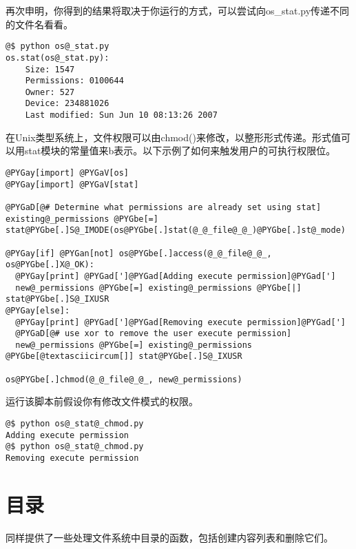 \documentclass[a4paper,10pt,english]{manual}
\begin{document}
再次申明，你得到的结果将取决于你运行的方式，可以尝试向os\_stat.py传递不同的文件名看看。

\begin{Verbatim}[commandchars=@\[\]]
@$ python os@_stat.py
os.stat(os@_stat.py):
    Size: 1547
    Permissions: 0100644
    Owner: 527
    Device: 234881026
    Last modified: Sun Jun 10 08:13:26 2007
\end{Verbatim}

在Unix类型系统上，文件权限可以由chmod()来修改，以整形形式传递。形式值可以用stat模块的常量值来b表示。以下示例了如何来触发用户的可执行权限位。

\begin{Verbatim}[commandchars=@\[\]]
@PYGay[import] @PYGaV[os]
@PYGay[import] @PYGaV[stat]

@PYGaD[@# Determine what permissions are already set using stat]
existing@_permissions @PYGbe[=] stat@PYGbe[.]S@_IMODE(os@PYGbe[.]stat(@_@_file@_@_)@PYGbe[.]st@_mode)

@PYGay[if] @PYGan[not] os@PYGbe[.]access(@_@_file@_@_, os@PYGbe[.]X@_OK):
  @PYGay[print] @PYGad[']@PYGad[Adding execute permission]@PYGad[']
  new@_permissions @PYGbe[=] existing@_permissions @PYGbe[|] stat@PYGbe[.]S@_IXUSR
@PYGay[else]:
  @PYGay[print] @PYGad[']@PYGad[Removing execute permission]@PYGad[']
  @PYGaD[@# use xor to remove the user execute permission]
  new@_permissions @PYGbe[=] existing@_permissions @PYGbe[@textasciicircum[]] stat@PYGbe[.]S@_IXUSR

os@PYGbe[.]chmod(@_@_file@_@_, new@_permissions)
\end{Verbatim}

运行该脚本前假设你有修改文件模式的权限。

\begin{Verbatim}[commandchars=@\[\]]
@$ python os@_stat@_chmod.py
Adding execute permission
@$ python os@_stat@_chmod.py
Removing execute permission
\end{Verbatim}


\section{目录}

同样提供了一些处理文件系统中目录的函数，包括创建内容列表和删除它们。
\end{document}
